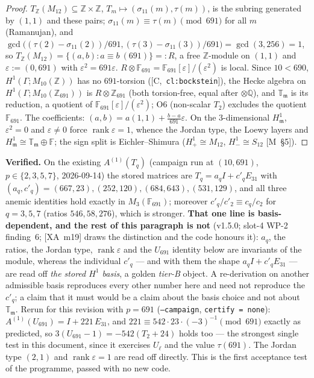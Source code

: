 \documentclass[11pt]{article}
\theoremstyle{remark}
\newcommand{\F}{\mathbb{F}}
\newcommand{\Z}{\mathbb{Z}}
\newcommand{\Q}{\mathbb{Q}}
\newcommand{\Ga}{\Gamma}
\DeclareMathOperator{\rank}{rank}
\newcommand{\T}{\mathbb{T}}
\newcommand{\m}{\mathfrak{m}}
\newcommand{\HA}[1]{[C,~\texttt{#1}]}      %
\newcommand{\Mnote}[1]{[M~\S#1]}            %
\begin{document}
\begin{proof}
$T_\Z(M_{12})\subseteq\Z\times\Z$, $T_m\mapsto(\sigma_{11}(m),\tau(m))$, is the subring generated
by $(1,1)$ and these pairs; $\sigma_{11}(m)\equiv\tau(m)\pmod{691}$ for all $m$ (Ramanujan),
and $\gcd\bigl((\tau(2)-\sigma_{11}(2))/691,(\tau(3)-\sigma_{11}(3))/691\bigr)=\gcd(3,256)=1$, so
$T_\Z(M_{12})=\{(a,b):a\equiv b\ (691)\}=:R$, a free $\Z$-module on $(1,1)$ and
$\varepsilon:=(0,691)$ with $\varepsilon^2=691\varepsilon$. $R\otimes\F_{691}=\F_{691}[\varepsilon]/(\varepsilon^2)$
is local. Since $10<690$, $H^1(\Ga;M_{10}(\Z))$ has no $691$-torsion (\HA{cl:bockstein}),
the Hecke algebra on $H^1(\Ga;M_{10}(\Z_{691}))$ is $R\otimes\Z_{691}$ (both torsion-free,
equal after $\otimes\Q$), and $\T_\m$ is its reduction, a quotient of
$\F_{691}[\varepsilon]/(\varepsilon^2)$; O6 (non-scalar $T_2$) excludes the quotient $\F_{691}$.
The coefficients: $(a,b)=a(1,1)+\frac{b-a}{691}\varepsilon$. On the $3$-dimensional $H^1_\m$,
$\varepsilon^2=0$ and $\varepsilon\ne0$ force $\rank\varepsilon=1$, whence the Jordan type,
the Loewy layers and $H^1_\m\cong\T_\m\oplus\F$; the sign split is Eichler--Shimura
($H^1_+\cong M_{12}$, $H^1_-\cong S_{12}$ \Mnote{5}).
\end{proof}
\textbf{Verified.} On the existing $A^{(1)}(T_q)$ (campaign run at $(10,691)$, $p\in\{2,3,5,7\}$,
2026-09-14) the stored matrices are $T_q=a_q I+c'_qE_{31}$ with
$(a_q,c'_q)=(667,23),(252,120),(684,643),(531,129)$, and all three anemic identities hold
exactly in $M_3(\F_{691})$; moreover $c'_q/c'_2\equiv c_q/c_2$ for $q=3,5,7$ (ratios
$546,58,276$), which is stronger. \textbf{That one line is basis-dependent, and the rest of
this paragraph is not} (v1.5.0; slot-4 WP-2 finding~6; [XA~m19] draws the distinction and
the code honours it): $a_q$, the ratios, the Jordan type, $\rank\varepsilon$ and the
$U_{691}$ identity below are invariants of the module, whereas the individual $c'_q$ --- and
with them the shape $a_qI+c'_qE_{31}$ --- are read off \emph{the stored $H^1$ basis}, a
golden \emph{tier-B} object. A re-derivation on another admissible basis reproduces every
other number here and need not reproduce the $c'_q$; a claim that it must would be a claim
about the basis choice and not about $\T_\m$. Rerun for this revision with $p=691$ (\texttt{--campaign},
\texttt{certify = none}): $A^{(1)}(U_{691})=I+221\,E_{31}$, and
$221\equiv542\cdot23\cdot(-3)^{-1}\pmod{691}$ exactly as predicted, so
$3(U_{691}-1)=-542(T_2+24)$ holds too --- the strongest single test in this document, since it
exercises $U_\ell$ and the value $\tau(691)$. The Jordan type $(2,1)$ and $\rank\varepsilon=1$
are read off directly. This is the first acceptance test of the programme, passed with no new
code.
\end{document}
